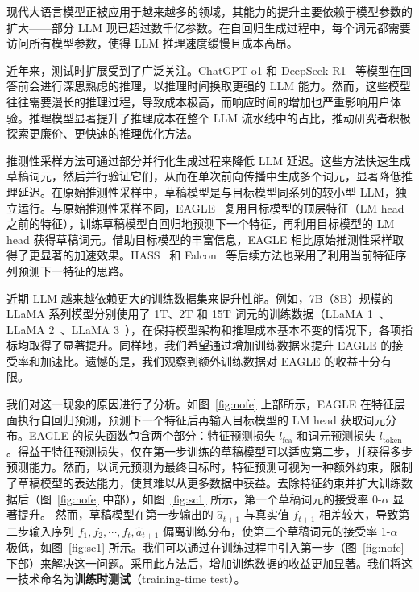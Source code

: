 \documentclass[11pt]{article}
\begin{document}
现代大语言模型正被应用于越来越多的领域，其能力的提升主要依赖于模型参数的扩大——部分 LLM 现已超过数千亿参数。在自回归生成过程中，每个词元都需要访问所有模型参数，使得 LLM 推理速度缓慢且成本高昂。

近年来，测试时扩展受到了广泛关注。ChatGPT o1 和 DeepSeek-R1~\cite{guo2025deepseek} 等模型在回答前会进行深思熟虑的推理，以推理时间换取更强的 LLM 能力。然而，这些模型往往需要漫长的推理过程，导致成本极高，而响应时间的增加也严重影响用户体验。推理模型显著提升了推理成本在整个 LLM 流水线中的占比，推动研究者积极探索更廉价、更快速的推理优化方法。

推测性采样方法可通过部分并行化生成过程来降低 LLM 延迟。这些方法快速生成草稿词元，然后并行验证它们，从而在单次前向传播中生成多个词元，显著降低推理延迟。在原始推测性采样中，草稿模型是与目标模型同系列的较小型 LLM，独立运行。与原始推测性采样不同，EAGLE~\cite{li2024eagle} 复用目标模型的顶层特征（LM head 之前的特征），训练草稿模型自回归地预测下一个特征，再利用目标模型的 LM head 获得草稿词元。借助目标模型的丰富信息，EAGLE 相比原始推测性采样取得了更显著的加速效果。HASS~\cite{zhang2024learning} 和 Falcon~\cite{gao2024falcon} 等后续方法也采用了利用当前特征序列预测下一特征的思路。

近期 LLM 越来越依赖更大的训练数据集来提升性能。例如，7B（8B）规模的 LLaMA 系列模型分别使用了 1T、2T 和 15T 词元的训练数据（LLaMA 1~\cite{touvron2023llama}、LLaMA 2~\cite{touvron2023llama2}、LLaMA 3~\cite{dubey2024llama}），在保持模型架构和推理成本基本不变的情况下，各项指标均取得了显著提升。同样地，我们希望通过增加训练数据来提升 EAGLE 的接受率和加速比。遗憾的是，我们观察到额外训练数据对 EAGLE 的收益十分有限。

我们对这一现象的原因进行了分析。如图~\ref{fig:nofe} 上部所示，EAGLE 在特征层面执行自回归预测，预测下一个特征后再输入目标模型的 LM head 获取词元分布。EAGLE 的损失函数包含两个部分：特征预测损失 $l_{\text{fea}}$ 和词元预测损失 $l_{\text{token}}$。得益于特征预测损失，仅在第一步训练的草稿模型可以适应第二步，并获得多步预测能力。然而，以词元预测为最终目标时，特征预测可视为一种额外约束，限制了草稿模型的表达能力，使其难以从更多数据中获益。去除特征约束并扩大训练数据后（图~\ref{fig:nofe} 中部），如图~\ref{fig:sc1} 所示，第一个草稿词元的接受率 $0$-$\alpha$ 显著提升。
然而，草稿模型在第一步输出的 $\hat{a}_{t+1}$ 与真实值 $f_{t+1}$ 相差较大，导致第二步输入序列 $f_1,f_2,\cdots,f_t,\hat{a}_{t+1}$ 偏离训练分布，使第二个草稿词元的接受率 $1$-$\alpha$ 极低，如图~\ref{fig:sc1} 所示。我们可以通过在训练过程中引入第一步（图~\ref{fig:nofe} 下部）来解决这一问题。采用此方法后，增加训练数据的收益更加显著。我们将这一技术命名为\textbf{训练时测试}（training-time test）。
\end{document}
